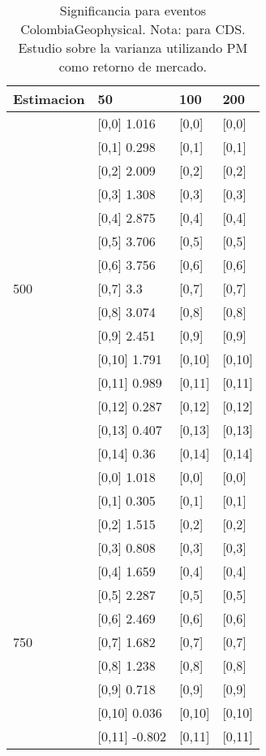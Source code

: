 \begin{table}

\caption{Significancia para eventos ColombiaGeophysical. Nota: para CDS. Estudio sobre la varianza utilizando PM como retorno de mercado.}
\centering
\begin{tabular}[t]{llll}
\toprule
Estimacion & 50 & 100 & 200\\
\midrule
 & {}[0,0] 1.016 & {}[0,0] & {}[0,0]\\
 & {}[0,1] 0.298 & {}[0,1] & {}[0,1]\\
 & {}[0,2] 2.009 & {}[0,2] & {}[0,2]\\
 & {}[0,3] 1.308 & {}[0,3] & {}[0,3]\\
 & {}[0,4] 2.875 & {}[0,4] & {}[0,4]\\
\addlinespace
 & {}[0,5] 3.706 & {}[0,5] & {}[0,5]\\
 & {}[0,6] 3.756 & {}[0,6] & {}[0,6]\\
500 & {}[0,7] 3.3 & {}[0,7] & {}[0,7]\\
 & {}[0,8] 3.074 & {}[0,8] & {}[0,8]\\
 & {}[0,9] 2.451 & {}[0,9] & {}[0,9]\\
\addlinespace
 & {}[0,10] 1.791 & {}[0,10] & {}[0,10]\\
 & {}[0,11] 0.989 & {}[0,11] & {}[0,11]\\
 & {}[0,12] 0.287 & {}[0,12] & {}[0,12]\\
 & {}[0,13] 0.407 & {}[0,13] & {}[0,13]\\
 & {}[0,14] 0.36 & {}[0,14] & {}[0,14]\\
\addlinespace
 & {}[0,0] 1.018 & {}[0,0] & {}[0,0]\\
 & {}[0,1] 0.305 & {}[0,1] & {}[0,1]\\
 & {}[0,2] 1.515 & {}[0,2] & {}[0,2]\\
 & {}[0,3] 0.808 & {}[0,3] & {}[0,3]\\
 & {}[0,4] 1.659 & {}[0,4] & {}[0,4]\\
\addlinespace
 & {}[0,5] 2.287 & {}[0,5] & {}[0,5]\\
 & {}[0,6] 2.469 & {}[0,6] & {}[0,6]\\
750 & {}[0,7] 1.682 & {}[0,7] & {}[0,7]\\
 & {}[0,8] 1.238 & {}[0,8] & {}[0,8]\\
 & {}[0,9] 0.718 & {}[0,9] & {}[0,9]\\
\addlinespace
 & {}[0,10] 0.036 & {}[0,10] & {}[0,10]\\
 & {}[0,11] -0.802 & {}[0,11] & {}[0,11]\\

\end{tabular}
\end{table}
